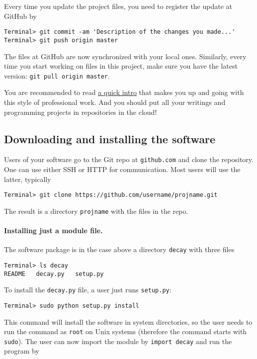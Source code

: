\documentclass[graybox,sectrefs,envcountresetchap,open=right,final]{svmonodo}
\begin{document}
Every time you update the project files, you need to register
the update at GitHub by

\begin{Verbatim}[frame=lines,label=\fbox{{\tiny Terminal}},framesep=2.5mm,framerule=0.7pt,fontsize=\fontsize{9pt}{9pt}]
Terminal> git commit -am 'Description of the changes you made...'
Terminal> git push origin master
\end{Verbatim}
The files at GitHub are now synchronized with your local ones.
Similarly, every time you start working on files in this project,
make sure you have the latest version:
\texttt{git pull origin master}.

You are recommended to read \href{{http://hplgit.github.io/teamods/bitgit/html/}}{a quick intro} that makes you
up and going with this style of
professional work. And you should put all your writings and programming
projects in repositories in the cloud!

\subsection{Downloading and installing the software}

Users of your software go to the Git repo at \texttt{github.com} and
clone the repository. One can use either SSH or HTTP for communication.
Most users will use the latter, typically

\begin{Verbatim}[frame=lines,label=\fbox{{\tiny Terminal}},framesep=2.5mm,framerule=0.7pt,fontsize=\fontsize{9pt}{9pt}]
Terminal> git clone https://github.com/username/projname.git
\end{Verbatim}
The result is a directory \texttt{projname} with the files in the repo.

\paragraph{Installing just a module file.}
The software package is in the case above a directory \texttt{decay} with three files

\begin{Verbatim}[frame=lines,label=\fbox{{\tiny Terminal}},framesep=2.5mm,framerule=0.7pt,fontsize=\fontsize{9pt}{9pt}]
Terminal> ls decay
README   decay.py   setup.py
\end{Verbatim}
To install the \texttt{decay.py} file, a user
just runs \texttt{setup.py}:

\begin{Verbatim}[frame=lines,label=\fbox{{\tiny Terminal}},framesep=2.5mm,framerule=0.7pt,fontsize=\fontsize{9pt}{9pt}]
Terminal> sudo python setup.py install
\end{Verbatim}
This command will install the software in system directories, so the user
needs to run the command as \texttt{root} on Unix systems (therefore the command
starts with \texttt{sudo}).
The user can now import the module by \texttt{import decay} and run
the program by
\end{document}
